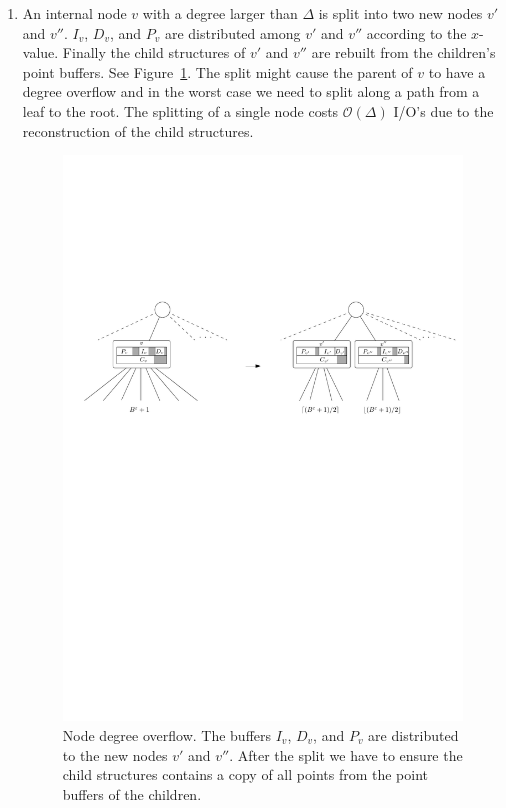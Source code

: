 \documentclass[twoside,11pt,openright]{report}
\begin{document}
\begin{enumerate}[label=(\roman*)]
	\item\label{update:deg} An internal node $v$ with a degree larger than $\Delta$ is split into two new nodes $v'$ and $v''$. $I_v$, $D_v$, and $P_v$ are distributed among $v'$ and $v''$ according to the $x$-value. Finally the child structures of $v'$ and $v''$ are rebuilt from the children's point buffers. See Figure~\ref{fig:brodal_node_degree_overflow}. The split might cause the parent of $v$ to have a degree overflow and in the worst case we need to split along a path from a leaf to the root. The splitting of a single node costs $\mathcal{O}(\Delta)$ I/O's due to the reconstruction of the child structures.
	
	
	\begin{figure}[h]
		\centering
		\includegraphics[width=1\textwidth]{../figures/brodal_node_degree_overflow}
		\caption{Node degree overflow. The buffers $I_v$, $D_v$, and $P_v$ are distributed to the new nodes $v'$ and $v''$. After the split we have to ensure the child structures contains a copy of all points from the point buffers of the children.}
		\label{fig:brodal_node_degree_overflow}
	\end{figure}		
	

\end{enumerate}
\end{document}

